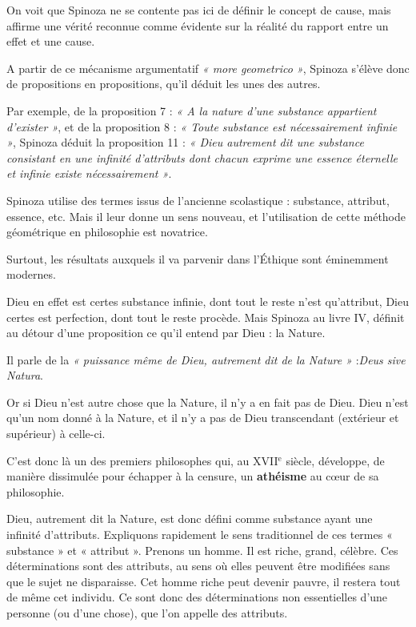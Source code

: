 On voit que Spinoza ne se contente pas ici de définir le concept de cause, mais
affirme une vérité reconnue comme évidente sur la réalité du rapport entre un
effet et une cause.

\vspace{0.5cm}
A partir de ce mécanisme argumentatif {\it « more geometrico »}, Spinoza
s’élève donc de propositions en propositions, qu’il déduit les unes des autres.

Par exemple, de la proposition 7 : {\it « A la nature d’une substance appartient
d’exister »}, et de la proposition 8 : {\it « Toute substance est nécessairement
infinie »}, Spinoza déduit la proposition 11 : {\it « Dieu autrement dit une substance
consistant en une infinité d’attributs dont chacun exprime une essence
éternelle et infinie existe nécessairement »}.

\vspace{0.5cm}
Spinoza utilise des termes issus de l’ancienne scolastique : substance,
attribut, essence, etc. Mais il leur donne un sens nouveau, et l’utilisation
de cette méthode géométrique en philosophie est novatrice.

Surtout, les résultats auxquels il va parvenir dans l’Éthique sont éminemment
modernes.

Dieu en effet est certes substance infinie, dont tout le reste n’est
qu’attribut, Dieu certes est perfection, dont tout le reste procède.
Mais Spinoza au livre IV, définit au détour d’une proposition ce qu’il entend
par Dieu : la Nature.

Il parle de la {\it « puissance même de Dieu, autrement dit de la Nature »} :{\it Deus
sive Natura}.

Or si Dieu n’est autre chose que la Nature, il n’y a en fait pas de Dieu. Dieu
n’est qu’un nom donné à la Nature, et il n’y a pas de Dieu transcendant
(extérieur et supérieur) à celle-ci.

C’est donc là un des premiers philosophes qui, au {\footnotesize XVII$^\text{e}$} siècle, développe, de
manière dissimulée pour échapper à la censure, un {\bf athéisme} au cœur de sa
philosophie.

\vspace{0.5cm}
Dieu, autrement dit la Nature, est donc défini comme substance ayant une
infinité d’attributs. Expliquons rapidement le sens traditionnel de ces termes
« substance » et « attribut ». Prenons un homme. Il est riche, grand, célèbre.
Ces déterminations sont des attributs, au sens où elles peuvent être modifiées
sans que le sujet ne disparaisse. Cet homme riche peut devenir pauvre, il
restera tout de même cet individu. Ce sont donc des déterminations non
essentielles d’une personne (ou d’une chose), que l’on appelle des attributs.

